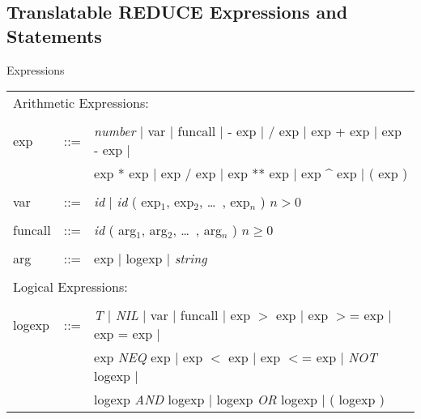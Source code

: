 \subsection{Translatable REDUCE Expressions and Statements}
\begin{describe}{Expressions}
\begin{tabular}{lll}
\multicolumn{3}{l}{Arithmetic Expressions:} \\
& & \\
exp & ::= & {\it number} $\mid$  var  $\mid$  funcall  $\mid$  - exp $\mid$
/ exp  $\mid$  exp + exp  $\mid$  exp - exp $\mid$ \\
        & & exp * exp  $\mid$  exp / exp  $\mid$  exp ** exp $\mid$
exp \^{} exp  $\mid$  ( exp )\\
& & \\
var & ::= & {\it id} $\mid$ {\it id} ( exp$_1$, exp$_2$, \dots\ , exp$_n$ ) $n > 0$ \\
& & \\
funcall & ::= & {\it id} ( arg$_1$, arg$_2$, \dots\ , arg$_n$ ) $n \geq 0$ \\
& & \\
arg & ::=  & exp $\mid$ logexp $\mid$ {\it string} \\
& &\\
\multicolumn{3}{l}{Logical Expressions:}\\
& & \\
logexp & ::= & {\it T} $\mid$ {\it NIL} $\mid$  var  $\mid$  funcall $\mid$
        exp $>$ exp  $\mid$  exp $>$= exp $\mid$
         exp = exp  $\mid$ \\
        & & exp {\it NEQ} exp $\mid$ exp $<$ exp  $\mid$  exp $<$= exp $\mid$
        {\it NOT\/} logexp  $\mid$ \\
        & &  logexp {\it AND\/} logexp $\mid$ logexp {\it OR\/} logexp  $\mid$  ( logexp )\\
\end{tabular}
\end{describe}

